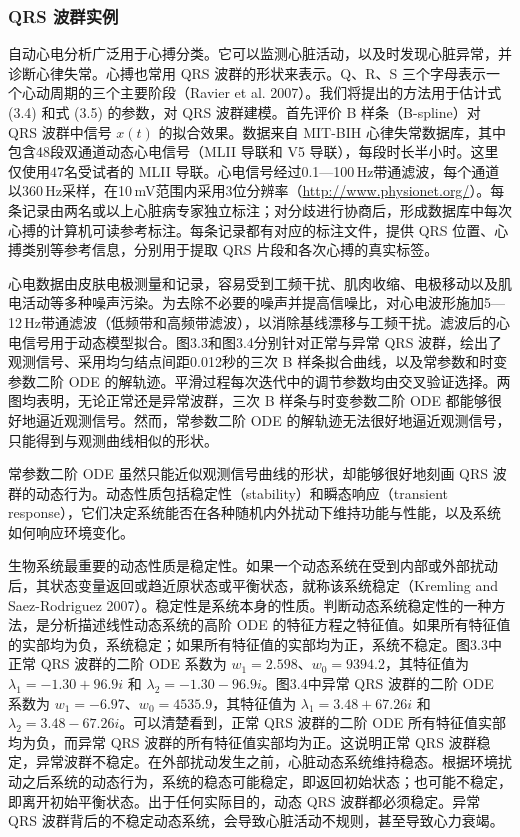 \subsubsection{QRS 波群实例}

自动心电分析广泛用于心搏分类。它可以监测心脏活动，以及时发现心脏异常，并诊断心律失常。心搏也常用 QRS 波群的形状来表示。Q、R、S 三个字母表示一个心动周期的三个主要阶段（Ravier et al. 2007）。我们将提出的方法用于估计式 (3.4) 和式 (3.5) 的参数，对 QRS 波群建模。首先评价 B 样条（B-spline）对 QRS 波群中信号 $x(t)$ 的拟合效果。数据来自 MIT-BIH 心律失常数据库，其中包含48段双通道动态心电信号（MLII 导联和 V5 导联），每段时长半小时。这里仅使用47名受试者的 MLII 导联。心电信号经过0.1—100\,Hz带通滤波，每个通道以360\,Hz采样，在10\,mV范围内采用3位分辨率（\url{http://www.physionet.org/}）。每条记录由两名或以上心脏病专家独立标注；对分歧进行协商后，形成数据库中每次心搏的计算机可读参考标注。每条记录都有对应的标注文件，提供 QRS 位置、心搏类别等参考信息，分别用于提取 QRS 片段和各次心搏的真实标签。

心电数据由皮肤电极测量和记录，容易受到工频干扰、肌肉收缩、电极移动以及肌电活动等多种噪声污染。为去除不必要的噪声并提高信噪比，对心电波形施加5—12\,Hz带通滤波（低频带和高频带滤波），以消除基线漂移与工频干扰。滤波后的心电信号用于动态模型拟合。图3.3和图3.4分别针对正常与异常 QRS 波群，绘出了观测信号、采用均匀结点间距0.012秒的三次 B 样条拟合曲线，以及常参数和时变参数二阶 ODE 的解轨迹。平滑过程每次迭代中的调节参数均由交叉验证选择。两图均表明，无论正常还是异常波群，三次 B 样条与时变参数二阶 ODE 都能够很好地逼近观测信号。然而，常参数二阶 ODE 的解轨迹无法很好地逼近观测信号，只能得到与观测曲线相似的形状。



\FloatBarrier


常参数二阶 ODE 虽然只能近似观测信号曲线的形状，却能够很好地刻画 QRS 波群的动态行为。动态性质包括稳定性（stability）和瞬态响应（transient response），它们决定系统能否在各种随机内外扰动下维持功能与性能，以及系统如何响应环境变化。

生物系统最重要的动态性质是稳定性。如果一个动态系统在受到内部或外部扰动后，其状态变量返回或趋近原状态或平衡状态，就称该系统稳定（Kremling and Saez-Rodriguez 2007）。稳定性是系统本身的性质。判断动态系统稳定性的一种方法，是分析描述线性动态系统的高阶 ODE 的特征方程之特征值。如果所有特征值的实部均为负，系统稳定；如果所有特征值的实部均为正，系统不稳定。图3.3中正常 QRS 波群的二阶 ODE 系数为 $w_1=2.598$、$w_0=9394.2$，其特征值为 $\lambda_1=-1.30+96.9i$ 和 $\lambda_2=-1.30-96.9i$。图3.4中异常 QRS 波群的二阶 ODE 系数为 $w_1=-6.97$、$w_0=4535.9$，其特征值为 $\lambda_1=3.48+67.26i$ 和 $\lambda_2=3.48-67.26i$。可以清楚看到，正常 QRS 波群的二阶 ODE 所有特征值实部均为负，而异常 QRS 波群的所有特征值实部均为正。这说明正常 QRS 波群稳定，异常波群不稳定。在外部扰动发生之前，心脏动态系统维持稳态。根据环境扰动之后系统的动态行为，系统的稳态可能稳定，即返回初始状态；也可能不稳定，即离开初始平衡状态。出于任何实际目的，动态 QRS 波群都必须稳定。异常 QRS 波群背后的不稳定动态系统，会导致心脏活动不规则，甚至导致心力衰竭。


